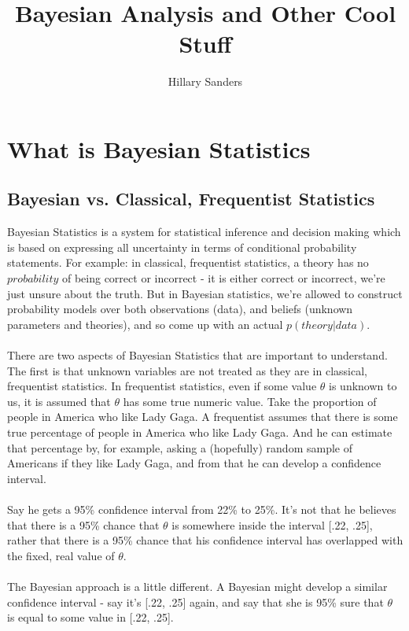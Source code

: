 \documentclass[12pt]{book}
\title{Bayesian Analysis and Other Cool Stuff}
\author{Hillary Sanders}
\begin{document}
\maketitle				

\tableofcontents

\chapter{What is Bayesian Statistics}

\section{Bayesian vs. Classical, Frequentist Statistics}
Bayesian Statistics is a system for statistical inference and decision making which is based on expressing all uncertainty in terms of conditional probability statements. For example: in classical, frequentist statistics, a theory has no $\textit{probability}$ of being correct or incorrect - it is either correct or incorrect, we're just unsure about the truth. But in Bayesian statistics, we're allowed to construct probability models over both observations (data), and beliefs (unknown parameters and theories), and so come up with an actual $p(theory|data)$.
\\\\
There are two aspects of Bayesian Statistics that are important to understand. The first is that unknown variables are not treated as they are in classical, frequentist statistics. In frequentist statistics, even if some value $\theta$ is unknown to us, it is assumed that $\theta$ has some true numeric value. Take the proportion of people in America who like Lady Gaga. A frequentist assumes that there is some true percentage of people in America who like Lady Gaga. And he can estimate that percentage by, for example, asking a (hopefully) random sample of Americans if they like Lady Gaga, and from that he can develop a confidence interval. 
\\\\
Say he gets a 95\% confidence interval from 22\% to 25\%. It's not that he believes that there is a 95\% chance that $\theta$ is somewhere inside the interval [.22, .25], rather that there is a 95\% chance that his confidence interval has overlapped with the fixed, real value of $\theta$. 
\\\\
The Bayesian approach is a little different. A Bayesian might develop a similar confidence interval - say it's [.22, .25] again, and say that she is 95\% sure that $\theta$ is equal to some value in [.22, .25].
\end{document}
